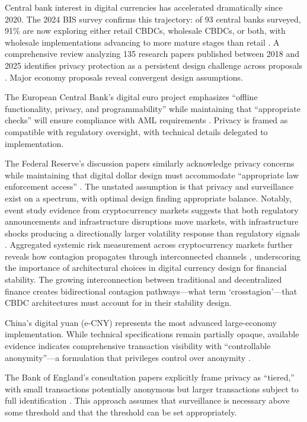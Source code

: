 \documentclass[11pt]{article}
\begin{document}
Central bank interest in digital currencies has accelerated dramatically since 2020. The 2024 BIS survey confirms this trajectory: of 93 central banks surveyed, 91\% are now exploring either retail CBDCs, wholesale CBDCs, or both, with wholesale implementations advancing to more mature stages than retail \citep{BIS2024Survey}. A comprehensive review analyzing 135 research papers published between 2018 and 2025 identifies privacy protection as a persistent design challenge across proposals \citep{CBDCSurvey2025}. Major economy proposals reveal convergent design assumptions.

The European Central Bank's digital euro project emphasizes ``offline functionality, privacy, and programmability'' while maintaining that ``appropriate checks'' will ensure compliance with AML requirements \citep{ECB2020, ECB2023}. Privacy is framed as compatible with regulatory oversight, with technical details delegated to implementation.

The Federal Reserve's discussion papers similarly acknowledge privacy concerns while maintaining that digital dollar design must accommodate ``appropriate law enforcement access'' \citep{FedReserve2022}. The unstated assumption is that privacy and surveillance exist on a spectrum, with optimal design finding appropriate balance. Notably, event study evidence from cryptocurrency markets suggests that both regulatory announcements and infrastructure disruptions move markets, with infrastructure shocks producing a directionally larger volatility response than regulatory signals \citep{farzulla2026multimoment}. Aggregated systemic risk measurement across cryptocurrency markets further reveals how contagion propagates through interconnected channels \citep{farzulla2025asri}, underscoring the importance of architectural choices in digital currency design for financial stability. The growing interconnection between traditional and decentralized finance creates bidirectional contagion pathways---what \citet{aufiero2025mapping} term `crosstagion'---that CBDC architectures must account for in their stability design.

China's digital yuan (e-CNY) represents the most advanced large-economy implementation. While technical specifications remain partially opaque, available evidence indicates comprehensive transaction visibility with ``controllable anonymity''---a formulation that privileges control over anonymity \citep{Auer2021, Fan2020}.

The Bank of England's consultation papers explicitly frame privacy as ``tiered,'' with small transactions potentially anonymous but larger transactions subject to full identification \citep{BoE2023}. This approach assumes that surveillance is necessary above some threshold and that the threshold can be set appropriately.
\end{document}
